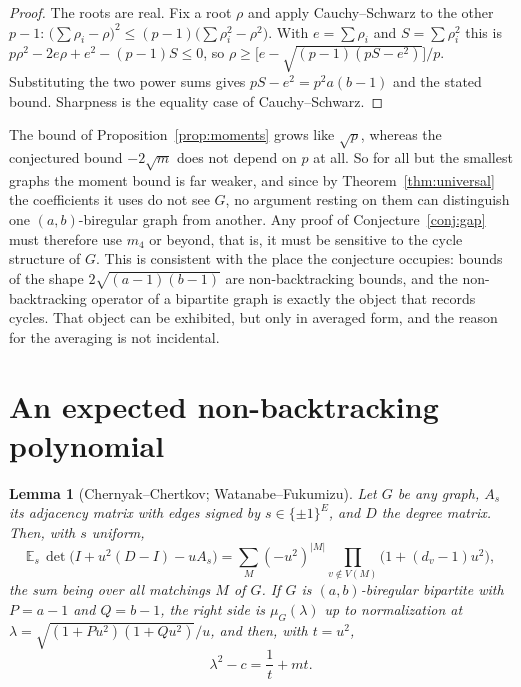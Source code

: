 \documentclass[11pt]{article}
\newtheorem{lemma}[theorem]{Lemma}
\theoremstyle{remark}
\begin{document}
\begin{proof}
The roots are real. Fix a root $\rho$ and apply Cauchy--Schwarz to the other
$p-1$: $\bigl(\sum\rho_i-\rho\bigr)^2\le(p-1)\bigl(\sum\rho_i^2-\rho^2\bigr)$.
With $e=\sum\rho_i$ and $S=\sum\rho_i^2$ this is
$p\rho^2-2e\rho+e^2-(p-1)S\le0$, so
$\rho\ge\bigl[e-\sqrt{(p-1)(pS-e^2)}\bigr]/p$. Substituting the two power sums
gives $pS-e^2=p^2a(b-1)$ and the stated bound. Sharpness is the equality case of
Cauchy--Schwarz.
\end{proof}

The bound of Proposition~\ref{prop:moments} grows like $\sqrt p$, whereas the
conjectured bound $-2\sqrt m$ does not depend on $p$ at all. So for all but the
smallest graphs the moment bound is far weaker, and since by
Theorem~\ref{thm:universal} the coefficients it uses do not see $G$, no argument
resting on them can distinguish one $(a,b)$-biregular graph from another. Any
proof of Conjecture~\ref{conj:gap} must therefore use $m_4$ or beyond, that is,
it must be sensitive to the cycle structure of $G$. This is consistent with the
place the conjecture occupies: bounds of the shape $2\sqrt{(a-1)(b-1)}$ are
non-backtracking bounds, and the non-backtracking operator of a bipartite graph
is exactly the object that records cycles. That object can be exhibited, but only
in averaged form, and the reason for the averaging is not incidental.

\section{An expected non-backtracking polynomial}

\begin{lemma}[Chernyak--Chertkov; Watanabe--Fukumizu]\label{lem:gauge}
Let $G$ be any graph, $A_s$ its adjacency matrix with edges signed by
$s\in\{\pm1\}^{E}$, and $D$ the degree matrix. Then, with $s$ uniform,
\[
\mathbb E_s\,\det\bigl(I+u^2(D-I)-uA_s\bigr)
=\sum_{M}(-u^2)^{|M|}\prod_{v\notin V(M)}\bigl(1+(d_v-1)u^2\bigr),
\]
the sum being over all matchings $M$ of $G$. If $G$ is $(a,b)$-biregular
bipartite with $P=a-1$ and $Q=b-1$, the right side is $\mu_G(\lambda)$ up to
normalization at $\lambda=\sqrt{(1+Pu^2)(1+Qu^2)}/u$, and then, with $t=u^2$,
\begin{equation}\label{eq:tsub}
\lambda^2-c=\frac1t+mt .
\end{equation}
\end{lemma}
\end{document}
